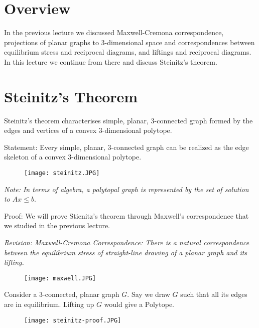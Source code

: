 \documentclass{article}
\begin{document}
    
    \section{Overview}
    In the previous lecture we discussed Maxwell-Cremona correspondence, projections of planar graphs to 3-dimensional space and correspondences between equilibrium stress and reciprocal diagrams, and liftings and reciprocal diagrams. In this lecture we continue from there and discuss Steinitz's theorem.
    

    \section{Steinitz's Theorem}
    Steinitz's theorem characterises simple, planar, 3-connected graph formed by the edges and vertices of a convex 3-dimensional polytope. 
    
    Statement: Every simple, planar, 3-connected graph can be realized as the edge skeleton of a convex 3-dimensional polytope. 
    
    
    
    \begin{figure}[H]
        \centering
        \texttt{[image: steinitz.JPG]}
    \label{fig:steinitz}
    \end{figure}
    
    \textit{Note: In terms of algebra, a polytopal graph is represented by the set of solution to $Ax \leq b$}.
    
    Proof: We will prove Stienitz's theorem through Maxwell's correspondence that we studied in the previous lecture. 
     
     \textit{Revision: Maxwell-Cremona Correspondence: There is a natural correspondence between the equilibrium stress of straight-line drawing of a planar graph and its lifting.}
     
     \begin{figure}[H]
        \centering
        \texttt{[image: maxwell.JPG]}

        \label{fig:maxwell}
    \end{figure}
     
     Consider a 3-connected, planar graph $G$. Say we draw $G$ such that all its edges are in equilibrium. Lifting up $G$ would give a Polytope. 
     
     \begin{figure}[H]
        \centering
        \texttt{[image: steinitz-proof.JPG]}

        \label{fig:steinitz-proff}
    \end{figure}
     
\end{document}
